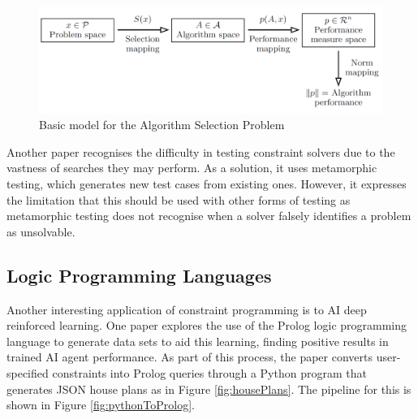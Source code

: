 \begin{figure}[H]
        \centering
        \includegraphics[width=\textwidth, height=0.3\textheight, keepaspectratio]{Images/AlgorithmSelection.png}
        \caption{Basic model for the Algorithm Selection Problem \cite{Data_Mining_and_Constraint_Programming}}
        \label{fig:algorithmSelection}
\end{figure}

Another paper \cite{Metamorphic_Testing} recognises the difficulty in testing constraint solvers due to the vastness of searches they may perform. As a solution, it uses metamorphic testing, which generates new test cases from existing ones. However, it expresses the limitation that this should be used with other forms of testing as metamorphic testing does not recognise when a solver falsely identifies a problem as unsolvable.

\subsection{Logic Programming Languages}
Another interesting application of constraint programming is to AI deep reinforced learning. One paper \cite{Prolog_Deep_Learning} explores the use of the Prolog logic programming language to generate data sets to aid this learning, finding positive results in trained AI agent performance. As part of this process, the paper converts user-specified constraints into Prolog queries through a Python program that generates JSON house plans as in Figure \ref{fig:housePlans}. The pipeline for this is shown in Figure \ref{fig:pythonToProlog}.

